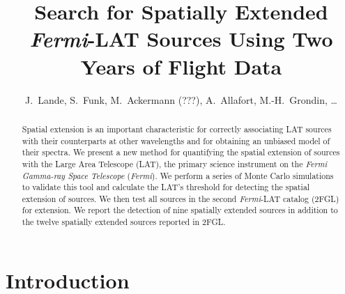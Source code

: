 \documentclass[12pt,preprint]{aastex}
\newcommand{\fermi}{\textit{Fermi}\xspace}
\newcommand{\hl}[1]{#1}
\begin{document}
\title{Search for Spatially Extended \fermi-LAT Sources Using Two Years of Flight
Data}


\author{
J.~Lande,
S.~Funk,
M.~Ackermann (???),
A.~Allafort,
M.-H.~Grondin,
\ldots
{}
}


\begin{abstract}
\hl{
Spatial extension is an important characteristic for correctly
associating LAT sources with their counterparts at other wavelengths
and for obtaining an unbiased model of their spectra.  We present a new
method for quantifying the spatial extension of sources with the Large
Area Telescope (LAT), the primary science instrument on the {\em \fermi
Gamma-ray Space Telescope} (\fermi).  We perform a series of Monte Carlo
simulations to validate this tool and calculate the LAT's threshold for
detecting the spatial extension of sources.  We then test all sources
in the second \fermi-LAT catalog (2FGL) for extension. We report the
detection of nine spatially extended sources in addition to the twelve
spatially extended sources reported in 2FGL.
}
\end{abstract}

\section{Introduction}
\end{document}
